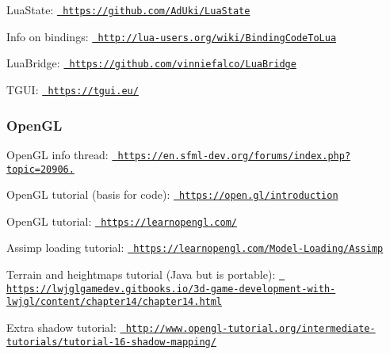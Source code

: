 Lua\+State\+: \href{https://github.com/AdUki/LuaState}{\texttt{ https\+://github.\+com/\+Ad\+Uki/\+Lua\+State}}

Info on bindings\+: \href{http://lua-users.org/wiki/BindingCodeToLua}{\texttt{ http\+://lua-\/users.\+org/wiki/\+Binding\+Code\+To\+Lua}}

Lua\+Bridge\+: \href{https://github.com/vinniefalco/LuaBridge}{\texttt{ https\+://github.\+com/vinniefalco/\+Lua\+Bridge}}

T\+G\+UI\+: \href{https://tgui.eu/}{\texttt{ https\+://tgui.\+eu/}}

\subsubsection*{Open\+GL}

Open\+GL info thread\+: \href{https://en.sfml-dev.org/forums/index.php?topic=20906.0}{\texttt{ https\+://en.\+sfml-\/dev.\+org/forums/index.\+php?topic=20906.}}

Open\+GL tutorial (basis for code)\+: \href{https://open.gl/introduction}{\texttt{ https\+://open.\+gl/introduction}}

Open\+GL tutorial\+: \href{https://learnopengl.com/}{\texttt{ https\+://learnopengl.\+com/}}

Assimp loading tutorial\+: \href{https://learnopengl.com/Model-Loading/Assimp}{\texttt{ https\+://learnopengl.\+com/\+Model-\/\+Loading/\+Assimp}}

Terrain and heightmaps tutorial (Java but is portable)\+: \href{https://lwjglgamedev.gitbooks.io/3d-game-development-with-lwjgl/content/chapter14/chapter14.html}{\texttt{ https\+://lwjglgamedev.\+gitbooks.\+io/3d-\/game-\/development-\/with-\/lwjgl/content/chapter14/chapter14.\+html}}

Extra shadow tutorial\+: \href{http://www.opengl-tutorial.org/intermediate-tutorials/tutorial-16-shadow-mapping/}{\texttt{ http\+://www.\+opengl-\/tutorial.\+org/intermediate-\/tutorials/tutorial-\/16-\/shadow-\/mapping/}} 
